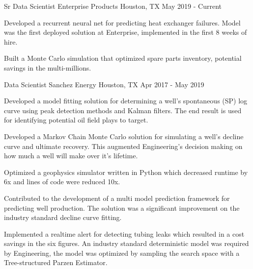 \vspace{-\baselineskip}


\begin{cventries}


\cventry
{Sr Data Scientist} %
{Enterprise Products} %
{Houston, TX} %
{May 2019 - Current} %
{ %
\begin{cvitems}
\item {Developed a recurrent neural net for predicting heat exchanger failures. Model was the first deployed solution at Enterprise, implemented in the first 8 weeks of hire.}
\item {Built a Monte Carlo simulation that optimized spare parts inventory, potential savings in the multi-millions.}
\end{cvitems}
}


\cventry
{Data Scientist} %
{Sanchez Energy} %
{Houston, TX} %
{Apr 2017 - May 2019} %
{ %
\begin{cvitems}
\item {Developed a model fitting solution for determining a well's spontaneous (SP) log curve using peak detection methods and Kalman filters. The end result is used for identifying potential oil field plays to target.}
\item {Developed a Markov Chain Monte Carlo solution for simulating a well's decline curve and ultimate recovery. This augmented Engineering's decision making on how much a well will make over it's lifetime.}
\item {Optimized a geophysics simulator written in Python which decreased runtime by 6x and lines of code were reduced 10x.}
\item {Contributed to the development of a multi model prediction framework for predicting well production. The solution was a significant improvement on the industry standard decline curve fitting.}
\item {Implemented a realtime alert for detecting tubing leaks which resulted in a cost savings in the six figures. An industry standard deterministic model was required by Engineering, the model was optimized by sampling the search space with a Tree-structured Parzen Estimator.}
\end{cvitems}
}


\end{cventries}
